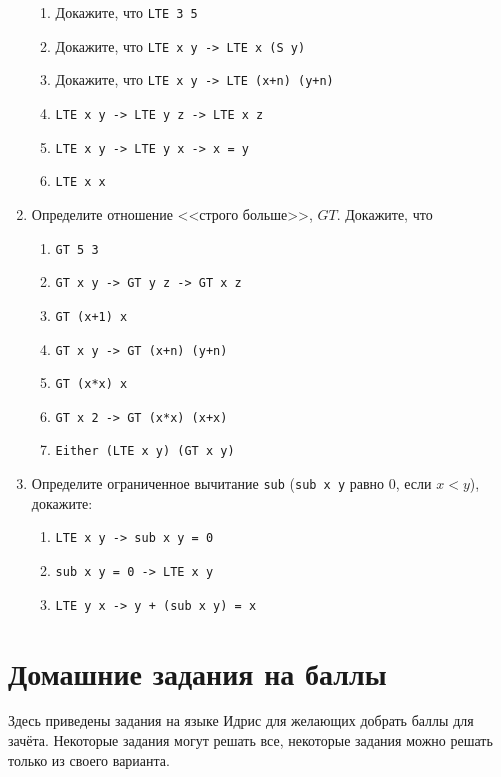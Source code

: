 \documentclass[10pt,a4paper,oneside]{article}
\begin{document}
\begin{enumerate}
\begin{enumerate}
\item Докажите, что \verb!LTE 3 5!
\item Докажите, что \verb!LTE x y -> LTE x (S y)!
\item Докажите, что \verb!LTE x y -> LTE (x+n) (y+n)!
\item \verb!LTE x y -> LTE y z -> LTE x z!
\item \verb!LTE x y -> LTE y x -> x = y!
\item \verb!LTE x x!
\end{enumerate}

\item Определите отношение <<строго больше>>, $GT$. Докажите, что

\begin{enumerate}
\item \verb!GT 5 3!
\item \verb!GT x y -> GT y z -> GT x z!
\item \verb!GT (x+1) x!
\item \verb!GT x y -> GT (x+n) (y+n)!
\item \verb!GT (x*x) x!
\item \verb!GT x 2 -> GT (x*x) (x+x)!
\item \verb!Either (LTE x y) (GT x y)!
\end{enumerate}

\item Определите ограниченное вычитание \verb!sub! (\verb!sub x y! равно 0, если $x < y$), 
докажите:
\begin{enumerate}
\item \verb!LTE x y -> sub x y = 0!
\item \verb!sub x y = 0 -> LTE x y!
\item \verb!LTE y x -> y + (sub x y) = x!
\end{enumerate}

\end{enumerate}

\section*{Домашние задания на баллы}

Здесь приведены задания на языке Идрис для желающих добрать баллы для зачёта.
Некоторые задания могут решать все, некоторые задания можно решать только
из своего варианта.
\end{document}
